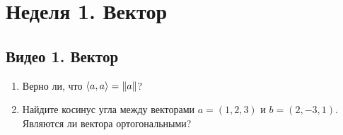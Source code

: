 \documentclass[a4paper,11pt]{article}
\begin{document}
\section{Неделя 1. Вектор}

\subsection{Видео 1. Вектор}

\begin{enumerate}
    \item Верно ли, что $\langle a, a \rangle = \norm{a}$?
    \item Найдите косинус угла между векторами $a = (1, 2, 3)$ и $b = (2, -3, 1)$. 
    Являются ли вектора ортогональными?
\end{enumerate}
\end{document}
